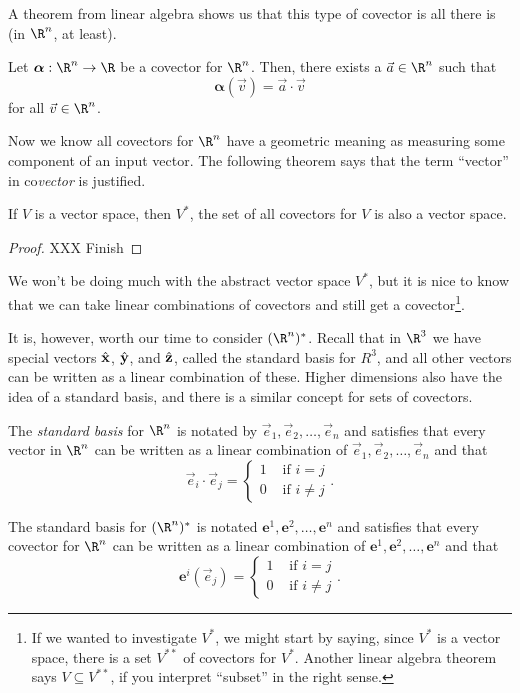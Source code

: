 A theorem from linear algebra shows us that this type of covector
is all there is (in $\R^n$, at least).

\begin{theorem}
	Let $\bm\alpha:\R^n\to \R$ be a covector for $\R^n$.  Then,
	there exists a $\vec a\in \R^n$ such that
	\[
		\bm\alpha (\vec v) = \vec a\cdot \vec v
	\]
	for all $\vec v\in\R^n$.
\end{theorem}


Now we know all covectors for $\R^n$ have a geometric meaning
as measuring some component of an input vector.  The following
theorem says that the term ``vector'' in co\emph{vector} is justified.

\begin{theorem}
	If $V$ is a vector space, then $V^*$, the set of all
	covectors for $V$ is also a vector space.
\end{theorem}
\begin{proof}
	XXX Finish
\end{proof}

We won't be doing much with the abstract vector space $V^*$, but it is
nice to know that we can take linear combinations of covectors
and still get a covector\footnote{ If we wanted to investigate $V^*$,
we might start by saying, since $V^*$ is a vector space, there is
a set $V^{**}$ of covectors for $V^*$.  Another linear algebra theorem
says $V\subseteq V^{**}$, if you interpret ``subset'' in the right sense. }.

It is, however, worth our time to consider $(\R^n)^*$.  Recall that
in $\R^3$ we have special vectors ${\hat {\mathbf x}}$, ${\hat {\mathbf y}}$, and ${\hat {\mathbf z}}$,
called the standard basis for $R^3$,
and all other vectors can be written as a linear combination of these.
Higher dimensions also have the idea of a standard basis, and there
is a similar concept for sets of covectors.

\begin{definition}
	The \emph{standard basis} for $\R^n$ is notated 
	by $\vec e_1,\vec e_2,\ldots,\vec e_n$ and satisfies that 
	every vector in $\R^n$ can be written as a linear combination of
	$\vec e_1,\vec e_2,\ldots,\vec e_n$ and that
	\[
		\vec e_i\cdot \vec e_j = \begin{cases}
			1 &\text{ if } i=j\\
			0 &\text{ if } i\neq j
		\end{cases}.
	\]

	The standard basis for $(\R^n)^*$ is notated
	$\bm e^1,\bm e^2,\ldots,\bm e^n$ and satisfies that
	every covector for $\R^n$ can be written as a linear combination of
	$\bm e^1,\bm e^2,\ldots,\bm e^n$ and that
	\[
		\bm e^i(\vec e_j) = \begin{cases}
			1 &\text{ if } i=j\\
			0 &\text{ if } i\neq j
		\end{cases}.
	\]
\end{definition}

